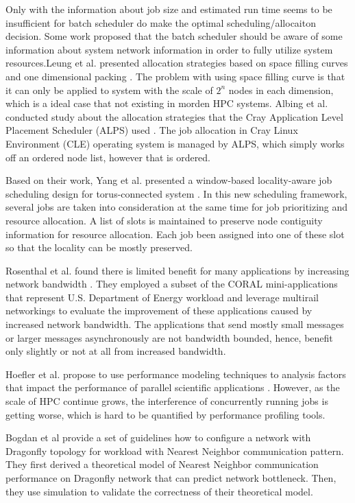 \documentclass[conference]{IEEEtran}
\begin{document}
Only with the information about job size and estimated run time seems to be insufficient for batch scheduler do make the 
optimal scheduling/allocaiton decision. Some work proposed that the batch scheduler should be aware of some information 
about system network information in order to fully utilize system resources.Leung et al. presented allocation strategies 
based on space filling curves and one dimensional packing \cite{leung}. The problem with using space filling curve is that  
it can only be applied to system with the scale of $2^n$ nodes in each dimension, which is a ideal case that not existing 
in morden HPC systems. Albing et al. conducted study about the allocation strategies that the Cray
Application Level Placement Scheduler (ALPS) used \cite{carl-cug}. The job allocation in Cray Linux Environment (CLE) 
operating system is managed by ALPS, which simply works off an ordered node list, however that is ordered. 

Based on their 
work, Yang et al. presented a window-based locality-aware job scheduling design for torus-connected system
\cite{yang-cluster14}. In this new scheduling framework, several jobs are taken into  consideration at the same time for job 
prioritizing and resource allocation. A list of slots is maintained to preserve node contiguity information for
resource allocation. Each job been assigned into one of these slot so that the locality can be mostly preserved.

Rosenthal et al. found there is limited benefit for many applications by
increasing network bandwidth \cite{rosenthal}. They employed a subset of the
CORAL mini-applications that represent U.S. Department of Energy workload and
leverage multirail networkings to evaluate the improvement of these applications
caused by increased network bandwidth. The applications that send mostly small
messages or larger messages asynchronously are not bandwidth bounded, hence,
benefit only slightly or not at all from increased bandwidth.

   

Hoefler et al. propose to use performance modeling techniques to analysis 
factors that impact the performance of parallel scientific applications 
\cite{hoefler-modeling}. However, as the scale of HPC continue grows, the 
interference of concurrently running jobs is getting worse, which is hard to be 
quantified by performance profiling tools.


Bogdan et al provide a set of guidelines how to configure a network with 
Dragonfly topology for workload with Nearest Neighbor communication 
pattern\cite{Bogdan-hpdc14}. They first derived a theoretical model of Nearest 
Neighbor communication performance on Dragonfly network that can predict network 
bottleneck. Then, they use simulation to validate the correctness of their 
theoretical model.
\end{document}
